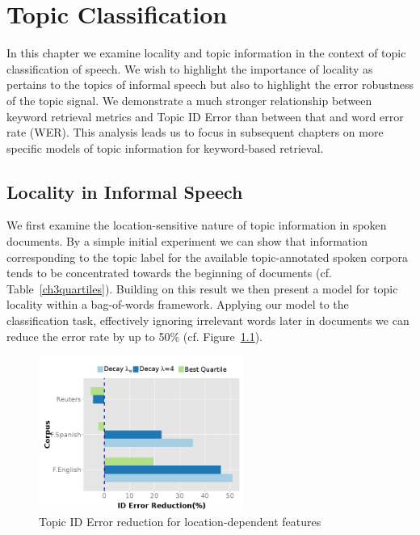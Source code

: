 \chapter{Topic Classification}
\label{sec:classification}
In this chapter we examine locality and topic information in the context of topic classification of speech.   We wish to highlight the importance of locality as pertains to the topics of informal speech but also to highlight the error robustness of the topic signal.  We demonstrate a much stronger  relationship between keyword retrieval metrics and Topic ID Error than between that and word error rate (WER).  This analysis leads us to focus in  subsequent chapters on more specific models of topic information for keyword-based retrieval.

\section{Locality in Informal Speech}
\label{sec:topicDrift}
We first examine the location-sensitive nature of topic information in spoken documents.  By a simple initial experiment we can show that information corresponding to the topic label for the available topic-annotated spoken corpora tends to be concentrated towards the beginning of documents (cf. Table~\ref{ch3quartiles}).  Building on this result we then present a model for topic locality within a bag-of-words framework.  Applying our model to the classification task, effectively ignoring irrelevant words later in documents we can reduce the error rate by up to 50\% (cf. Figure~\ref{ch3main}).

\begin{figure}[ht]
\centering
\includegraphics[width=0.6\textwidth]{locality2.png}
\caption[Topic ID Error reduction for location-dependent features]{\label{ch3main} Topic ID Error reduction for location-dependent features}
\end{figure}

